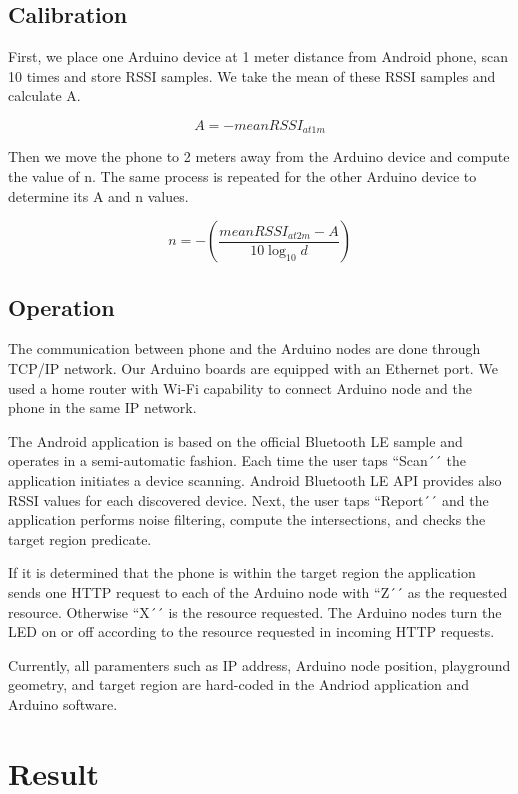 \documentclass[conference,a4paper]{../../sty/IEEEtran}
\begin{document}
\subsection{Calibration}

First, we place one Arduino device at 1 meter distance from Android phone, scan 10 times and store RSSI samples.
We take the mean of these RSSI samples and calculate A.

\begin{equation}
 A = -meanRSSI_{at 1m}
\end{equation}

Then we move the phone to 2 meters away from the Arduino device and compute the value of n.
The same process is repeated for the other Arduino device to determine its A and n values.

\begin{equation}
 n = -(\frac{ meanRSSI_{at 2m}-A}{10 \log_{10}d})
\end{equation}


\subsection{Operation}

The communication between phone and the Arduino nodes are done through TCP/IP network.
Our Arduino boards are equipped with an Ethernet port.
We used a home router with Wi-Fi capability to connect Arduino node and the phone in the same IP network.

The Android application is based on the official Bluetooth LE sample and operates in a semi-automatic fashion.
Each time the user taps ``Scan´´ the application initiates a device scanning.
Android Bluetooth LE API provides also RSSI values for each discovered device.
Next, the user taps ``Report´´ and the application performs noise filtering, compute the intersections, and checks the target region predicate.

If it is determined that the phone is within the target region the application sends one HTTP request to each of the Arduino node with ``Z´´ as the requested resource.
Otherwise ``X´´ is the resource requested.
The Arduino nodes turn the LED on or off according to the resource requested in incoming HTTP requests.

Currently, all paramenters such as IP address, Arduino node position, playground geometry, and target region are hard-coded in the Andriod application and Arduino software.

\section{Result}
\end{document}
